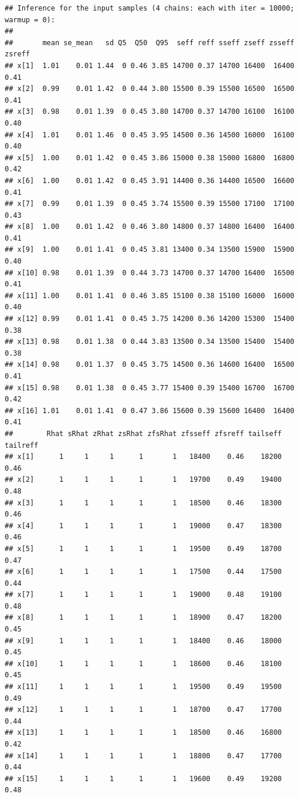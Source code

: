 \documentclass[american,]{article}
\begin{document}
\begin{verbatim}
## Inference for the input samples (4 chains: each with iter = 10000; warmup = 0):
## 
##       mean se_mean   sd Q5  Q50  Q95  seff reff sseff zseff zsseff zsreff
## x[1]  1.01    0.01 1.44  0 0.46 3.85 14700 0.37 14700 16400  16400   0.41
## x[2]  0.99    0.01 1.42  0 0.44 3.80 15500 0.39 15500 16500  16500   0.41
## x[3]  0.98    0.01 1.39  0 0.45 3.80 14700 0.37 14700 16100  16100   0.40
## x[4]  1.01    0.01 1.46  0 0.45 3.95 14500 0.36 14500 16000  16100   0.40
## x[5]  1.00    0.01 1.42  0 0.45 3.86 15000 0.38 15000 16800  16800   0.42
## x[6]  1.00    0.01 1.42  0 0.45 3.91 14400 0.36 14400 16500  16600   0.41
## x[7]  0.99    0.01 1.39  0 0.45 3.74 15500 0.39 15500 17100  17100   0.43
## x[8]  1.00    0.01 1.42  0 0.46 3.80 14800 0.37 14800 16400  16400   0.41
## x[9]  1.00    0.01 1.41  0 0.45 3.81 13400 0.34 13500 15900  15900   0.40
## x[10] 0.98    0.01 1.39  0 0.44 3.73 14700 0.37 14700 16400  16500   0.41
## x[11] 1.00    0.01 1.41  0 0.46 3.85 15100 0.38 15100 16000  16000   0.40
## x[12] 0.99    0.01 1.41  0 0.45 3.75 14200 0.36 14200 15300  15400   0.38
## x[13] 0.98    0.01 1.38  0 0.44 3.83 13500 0.34 13500 15400  15400   0.38
## x[14] 0.98    0.01 1.37  0 0.45 3.75 14500 0.36 14600 16400  16500   0.41
## x[15] 0.98    0.01 1.38  0 0.45 3.77 15400 0.39 15400 16700  16700   0.42
## x[16] 1.01    0.01 1.41  0 0.47 3.86 15600 0.39 15600 16400  16400   0.41
##        Rhat sRhat zRhat zsRhat zfsRhat zfsseff zfsreff tailseff tailreff
## x[1]      1     1     1      1       1   18400    0.46    18200     0.46
## x[2]      1     1     1      1       1   19700    0.49    19400     0.48
## x[3]      1     1     1      1       1   18500    0.46    18300     0.46
## x[4]      1     1     1      1       1   19000    0.47    18300     0.46
## x[5]      1     1     1      1       1   19500    0.49    18700     0.47
## x[6]      1     1     1      1       1   17500    0.44    17500     0.44
## x[7]      1     1     1      1       1   19000    0.48    19100     0.48
## x[8]      1     1     1      1       1   18900    0.47    18200     0.45
## x[9]      1     1     1      1       1   18400    0.46    18000     0.45
## x[10]     1     1     1      1       1   18600    0.46    18100     0.45
## x[11]     1     1     1      1       1   19500    0.49    19500     0.49
## x[12]     1     1     1      1       1   18700    0.47    17700     0.44
## x[13]     1     1     1      1       1   18500    0.46    16800     0.42
## x[14]     1     1     1      1       1   18800    0.47    17700     0.44
## x[15]     1     1     1      1       1   19600    0.49    19200     0.48

\end{verbatim}
\end{document}
